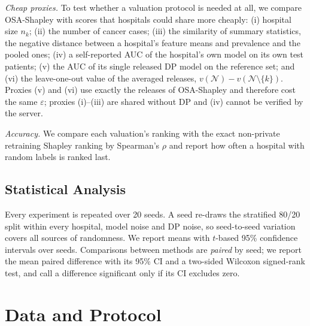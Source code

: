 \documentclass[journal]{IEEEtran}
\begin{document}
\emph{Cheap proxies.} To test whether a valuation protocol is needed at all, we compare OSA-Shapley with scores that hospitals could share more cheaply: (i) hospital size $n_k$; (ii) the number of cancer cases; (iii) the similarity of summary statistics, the negative distance between a hospital's feature means and prevalence and the pooled ones; (iv) a self-reported AUC of the hospital's own model on its own test patients; (v) the AUC of its single released DP model on the reference set; and (vi) the leave-one-out value of the averaged releases, $v(\mathcal N)-v(\mathcal N\setminus\{k\})$. Proxies (v) and (vi) use exactly the releases of OSA-Shapley and therefore cost the same $\varepsilon$; proxies (i)--(iii) are shared without DP and (iv) cannot be verified by the server.

\emph{Accuracy.} We compare each valuation's ranking with the exact non-private retraining Shapley ranking by Spearman's $\rho$ and report how often a hospital with random labels is ranked last.

\subsection{Statistical Analysis}
Every experiment is repeated over 20 seeds. A seed re-draws the stratified 80/20 split within every hospital, model noise and DP noise, so seed-to-seed variation covers all sources of randomness. We report means with $t$-based 95\% confidence intervals over seeds. Comparisons between methods are \emph{paired} by seed; we report the mean paired difference with its 95\% CI and a two-sided Wilcoxon signed-rank test, and call a difference significant only if its CI excludes zero.

\section{Data and Protocol}
\label{sec:data}
\end{document}
